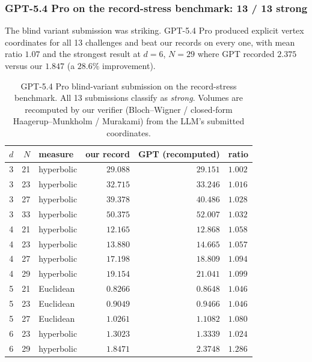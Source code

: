\documentclass[11pt]{article}
\begin{document}
\subsubsection{GPT-5.4 Pro on the record-stress benchmark: 13 / 13 strong}

The blind variant submission was striking. GPT-5.4 Pro produced
explicit vertex coordinates for all 13 challenges and beat our
records on every one, with mean ratio $1.07$ and the strongest
result at $d = 6$, $N = 29$ where GPT recorded $2.375$ versus our
$1.847$ (a $28.6\%$ improvement).

\begin{table}[ht]
\centering
\caption{GPT-5.4 Pro blind-variant submission on the record-stress
benchmark.  All 13 submissions classify as \emph{strong}.  Volumes
are recomputed by our verifier (Bloch--Wigner / closed-form
Haagerup--Munkholm / Murakami) from the LLM's submitted
coordinates.}
\label{tab:gpt-blind-record-stress}
\smallskip
\begin{tabular}{r r l r r l}
\toprule
$d$ & $N$ & measure & our record & GPT (recomputed) & ratio \\
\midrule
3 & 21 & hyperbolic & $29.088$  & $29.151$  & $1.002$ \\
3 & 23 & hyperbolic & $32.715$  & $33.246$  & $1.016$ \\
3 & 27 & hyperbolic & $39.378$  & $40.486$  & $1.028$ \\
3 & 33 & hyperbolic & $50.375$  & $52.007$  & $1.032$ \\
4 & 21 & hyperbolic & $12.165$  & $12.868$  & $1.058$ \\
4 & 23 & hyperbolic & $13.880$  & $14.665$  & $1.057$ \\
4 & 27 & hyperbolic & $17.198$  & $18.809$  & $1.094$ \\
4 & 29 & hyperbolic & $19.154$  & $21.041$  & $1.099$ \\
5 & 21 & Euclidean  & $0.8266$  & $0.8648$  & $1.046$ \\
5 & 23 & Euclidean  & $0.9049$  & $0.9466$  & $1.046$ \\
5 & 27 & Euclidean  & $1.0261$  & $1.1082$  & $1.080$ \\
6 & 23 & hyperbolic & $1.3023$  & $1.3339$  & $1.024$ \\
6 & 29 & hyperbolic & $\mathbf{1.8471}$ & $\mathbf{2.3748}$ & $\mathbf{1.286}$ \\
\bottomrule
\end{tabular}
\end{table}
\end{document}

